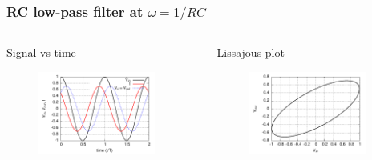 \documentclass[beamer]{standalone}
\begin{document}
\begin{frame}
\frametitle{RC low-pass filter at $\omega=1/RC$}
\begin{columns}[c]
 \begin{column}{.55\textwidth}
  Signal vs time
  \begin{figure}
   \includegraphics[angle=0,width=0.90\textwidth]{./plots/i_v_vr_w=rc}
  \end{figure}
 \end{column}
 \begin{column}{.45\textwidth}
  Lissajous plot
  \begin{figure}
   \includegraphics[angle=0,width=0.90\textwidth]{./plots/vc_vs_vin_w=rc}
  \end{figure}
 \end{column}
\end{columns}
\end{frame}
\end{document}
